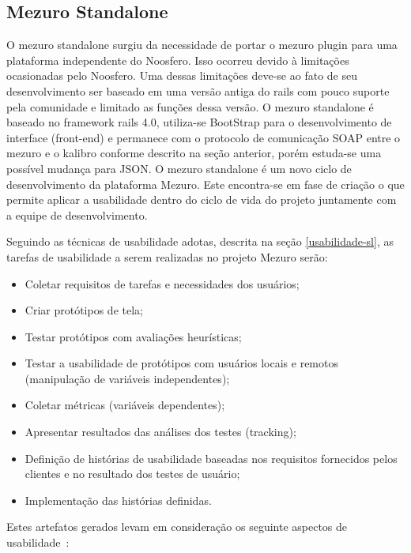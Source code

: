 \subsection{Mezuro Standalone}
\label{mezuro-standalone}

O mezuro standalone surgiu da necessidade de portar o mezuro plugin para uma plataforma independente do Noosfero. Isso ocorreu devido à limitações ocasionadas pelo Noosfero. Uma dessas limitações deve-se ao fato de seu desenvolvimento ser baseado em uma versão antiga do rails com pouco suporte pela comunidade e limitado as funções dessa versão.
O mezuro standalone é baseado no framework rails 4.0, utiliza-se BootStrap para o desenvolvimento de interface (front-end) e permanece com o protocolo de comunicação SOAP entre o mezuro e o kalibro conforme descrito na seção anterior, porém estuda-se uma possível mudança para JSON.
O mezuro standalone é um novo ciclo de desenvolvimento da plataforma Mezuro. Este encontra-se em fase de criação o que permite aplicar a usabilidade dentro do ciclo de vida do projeto juntamente com a equipe de desenvolvimento.

Seguindo as técnicas de usabilidade adotas, descrita na seção \ref{usabilidade-sl}, as tarefas de usabilidade a serem realizadas no projeto Mezuro serão:
\begin{itemize}
\item Coletar requisitos de tarefas e necessidades dos usuários;
\item Criar protótipos de tela;
\item Testar protótipos com avaliações heurísticas;
\item Testar a usabilidade de protótipos com usuários locais e remotos (manipulação de variáveis independentes);
\item Coletar métricas (variáveis dependentes);
\item Apresentar resultados das análises dos testes (tracking);
\item Definição de histórias de usabilidade baseadas nos requisitos fornecidos pelos clientes e no resultado dos testes de usuário;
\item Implementação das histórias definidas.
\end{itemize}

Estes artefatos gerados levam em consideração os seguinte aspectos de usabilidade~\cite{ergolist2013}:


